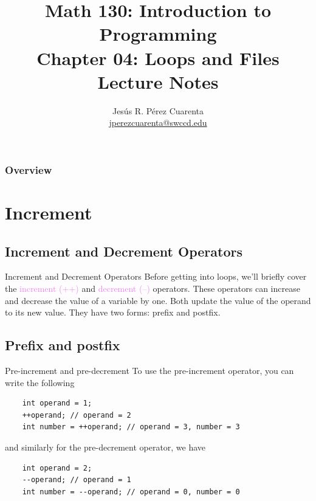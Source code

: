 \documentclass[11pt]{beamer}
\title[Chapter 04 Notes]{Math 130: Introduction to Programming \\ Chapter 04: Loops and Files \\ Lecture Notes}
\author{Jesús R. Pérez Cuarenta \\
\href{mailto:jperezcuarenta@swccd.edu}{jperezcuarenta@swccd.edu}
}
\date{} %
\newcommand{\violet}[1]{\textcolor{violet}{#1}}
\begin{document}
% 
% 
\section{}

\begin{frame}
  \maketitle
\end{frame}

\begin{frame}
\frametitle{Overview}
    \begin{multicols}{2}
    \tableofcontents
    \end{multicols}
\end{frame}

\section{Increment}
\subsection{Increment and Decrement Operators}
\begin{frame}{Increment and Decrement Operators}
    Before getting into loops, we'll briefly cover the \violet{increment (++)} and \violet{decrement (--)} operators. These operators can increase and decrease the value of a variable by one. Both update the value of the operand to its new value. They have two forms: prefix and postfix.
\end{frame}

\subsection{Prefix and postfix}
\begin{frame}[fragile]{Pre-increment and pre-decrement}
    To use the pre-increment operator, you can write the following
    \begin{lstlisting}
    int operand = 1;
    ++operand; // operand = 2
    int number = ++operand; // operand = 3, number = 3
    \end{lstlisting}
    and similarly for the pre-decrement operator, we have
    \begin{lstlisting}
    int operand = 2;
    --operand; // operand = 1
    int number = --operand; // operand = 0, number = 0
    \end{lstlisting}    
\end{frame}
\end{document}
